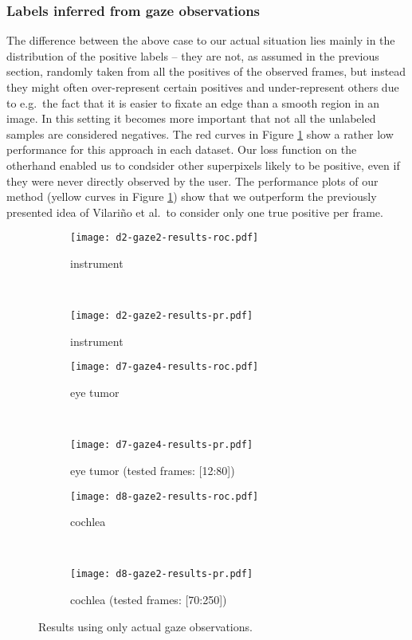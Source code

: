 \subsubsection*{Labels inferred from gaze observations}
The difference between the above case to our actual situation lies mainly in the distribution of the positive labels -- they are not, as assumed in the previous section, randomly taken from all the positives of the observed frames, but instead they might often over-represent certain positives and under-represent others due to e.g.\ the fact that it is easier to fixate an edge than a smooth region in an image. 
In this setting it becomes more important that not all the unlabeled samples are considered negatives. 
The red curves in Figure \ref{fig:results-curves} show a rather low performance for this approach in each dataset. 
Our loss function on the otherhand enabled us to condsider other superpixels likely to be positive, even if they were never directly observed by the user. 
The performance plots of our method (yellow curves in Figure \ref{fig:results-curves}) show that we outperform the previously presented idea of Vilari\~no et al.\ to consider only one true positive per frame.

\begin{figure}[ht]
	\centering
	\begin{subfigure}[h]{0.45\textwidth}
	\texttt{[image: d2-gaze2-results-roc.pdf]}	
		\caption*{instrument}
	\end{subfigure}
	~
	\begin{subfigure}[h]{0.45\textwidth}
	\texttt{[image: d2-gaze2-results-pr.pdf]}	
		\caption*{instrument}
	\end{subfigure}
	
	\vspace{3mm}
	\begin{subfigure}[h]{0.45\textwidth}
	\texttt{[image: d7-gaze4-results-roc.pdf]}	
		\caption*{eye tumor}
	\end{subfigure}
	~
	\begin{subfigure}[h]{0.45\textwidth}
	\texttt{[image: d7-gaze4-results-pr.pdf]}	
		\caption*{eye tumor (tested frames: [12:80])}
	\end{subfigure}	
	
	\vspace{3mm}
	\begin{subfigure}[h]{0.45\textwidth}
	\texttt{[image: d8-gaze2-results-roc.pdf]}	
		\caption*{cochlea}
	\end{subfigure}
	~
	\begin{subfigure}[h]{0.45\textwidth}
	\texttt{[image: d8-gaze2-results-pr.pdf]}	
		\caption*{cochlea (tested frames: [70:250])}
	\end{subfigure}		
	\caption{Results using only actual gaze observations.}
	\label{fig:results-curves}
\end{figure}


